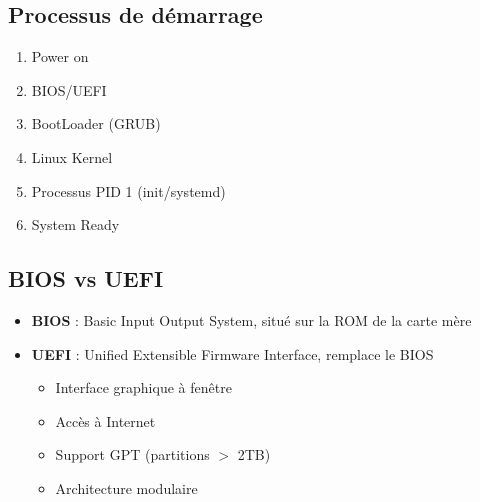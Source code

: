 \documentclass[12pt,a4paper]{article}
\begin{document}

\subsection{Processus de d\'emarrage}
\begin{enumerate}
    \item Power on
    \item BIOS/UEFI
    \item BootLoader (GRUB)
    \item Linux Kernel
    \item Processus PID 1 (init/systemd)
    \item System Ready
\end{enumerate}


\subsection{BIOS vs UEFI}
\begin{itemize}
    \item \textbf{BIOS} : Basic Input Output System, situ\'e sur la ROM de la carte m\`ere %
    \item \textbf{UEFI} : Unified Extensible Firmware Interface, remplace le BIOS %
    \begin{itemize}
        \item Interface graphique \`a fen\^etre %
        \item Acc\`es \`a Internet %
        \item Support GPT (partitions $>$ 2TB) %
        \item Architecture modulaire %
    \end{itemize}
\end{itemize}
\end{document}
